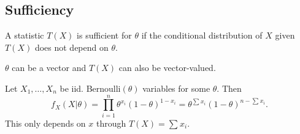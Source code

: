 \documentclass[a4paper]{scrartcl}
\begin{document}
\subsection{Sufficiency}
\begin{definition*}[Sufficiency]
     A statistic $T (X)$ is sufficient for $\theta$ if the conditional distribution of $X$ given $T (X)$ does not depend on $\theta$.
\end{definition*}
\begin{remark}
      $\theta$ can be a vector and $T (X)$ can also be vector-valued.
\end{remark}
\begin{example*}
      Let $X_1 , \ldots ,X_n$ be iid. Bernoulli$(\theta)$  variables for some $\theta$. Then \[
      f_{X}(X|\theta)=\prod_{i=1}^n \theta^{x_{i}}(1-\theta)^{1-x_{i}}=\theta^{\sum_{}^{}x_{i}} (1-\theta)^{n-\sum_{}^{}x_{i}}
      .\] This only depends on $x$ through $T (X)=\sum_{}^{}x_{i}$. 
\end{example*}
\end{document}
